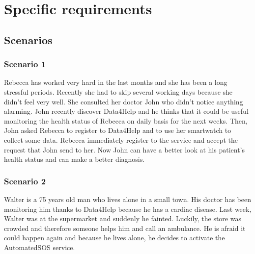 \chapter{Specific requirements}
\section{Scenarios}
\subsection{Scenario 1}

Rebecca has worked very hard in the last months and she has been a long stressful periods. Recently she had to skip several working days because she didn't feel very well. 
She consulted her doctor John who didn't notice anything alarming.
John recently discover Data4Help and he thinks that it could be useful monitoring the health status of Rebecca on daily basis for the next weeks.
Then, John asked Rebecca to register to Data4Help and to use her smartwatch to collect some data.
Rebecca immediately register to the service and accept the request that John send to her.
Now John can have a better look at his patient's health status and can make a better diagnosis.


\subsection{Scenario 2}
Walter is a 75 years old man who lives alone in a small town.
His doctor has been monitoring him thanks to Data4Help because he has a cardiac disease.
Last week, Walter was at the supermarket and suddenly he fainted. Luckily, the store was crowded and therefore someone helps him and call an ambulance.
He is afraid it could happen again and because he lives alone, he decides to activate the AutomatedSOS service.







